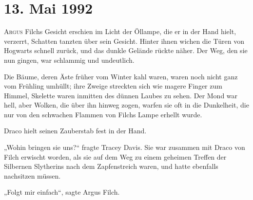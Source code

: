 
\section{13. Mai 1992}

\lettrine{A}{rgus} Filchs Gesicht erschien im Licht der Öllampe, die er in der Hand hielt, verzerrt, Schatten tanzten über sein Gesicht. Hinter ihnen wichen die Türen von Hogwarts schnell zurück, und das dunkle Gelände rückte näher. Der Weg, den sie nun gingen, war schlammig und undeutlich.

Die Bäume, deren Äste früher vom Winter kahl waren, waren noch nicht ganz vom Frühling umhüllt; ihre Zweige streckten sich wie magere Finger zum Himmel, Skelette waren inmitten des dünnen Laubes zu sehen. Der Mond war hell, aber Wolken, die über ihn hinweg zogen, warfen sie oft in die Dunkelheit, die nur von den schwachen Flammen von Filchs Lampe erhellt wurde.

Draco hielt seinen Zauberstab fest in der Hand.

„Wohin bringen sie uns?“ fragte Tracey Davis. Sie war zusammen mit Draco von Filch erwischt worden, als sie auf dem Weg zu einem geheimen Treffen der Silbernen Slytherins nach dem Zapfenstreich waren, und hatte ebenfalls nachsitzen müssen.

„Folgt mir einfach“, sagte Argus Filch.

